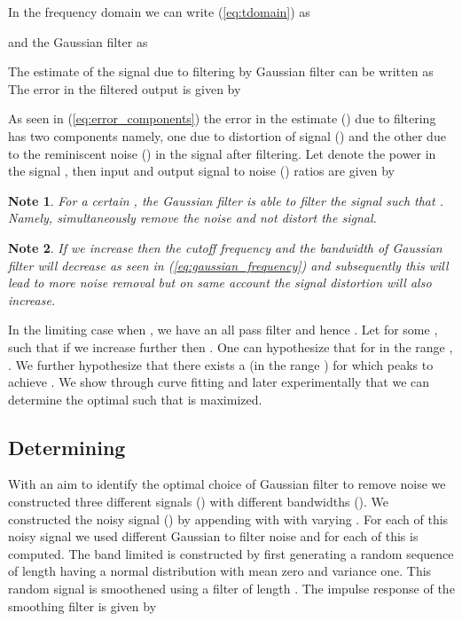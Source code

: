 \documentclass[journal,onecolumn]{IEEEtran}
\newtheorem{mynote}{Note}
\begin{document}
In the frequency domain we can write (\ref{eq:tdomain}) as
 
 and the Gaussian filter as

  The estimate of the signal 
 due to filtering by Gaussian filter can be
written as
  The error in the filtered output is given by
 
 As seen in (\ref{eq:error_components}) the error in the estimate ()
due to 
filtering has two components namely, one due to distortion of signal 
()
and 
the other due to the reminiscent noise  ()
in the signal after filtering. 
Let  denote the power in the signal , then
input and output signal to noise () ratios are given by 
 
\begin{mynote}
For a certain ,  the Gaussian filter is able to filter the signal
such that . Namely,
simultaneously 
remove the
noise and 
not distort the signal. 
\end{mynote}
\begin{mynote}
If we increase  then the cutoff frequency and the 
bandwidth of Gaussian filter will decrease as seen in 
(\ref{eq:gaussian_frequency}) and subsequently this will lead to more 
noise removal but on same account the signal distortion will also increase. 
\end{mynote}
In the limiting case when 
,  we have an all pass filter and hence 
. 
Let for some  
, such that  
if we increase  further then . 
One can hypothesize that for  in the range 
, . 
We further hypothesize that there exists a 
 (in the range ) for which  
peaks to achieve . We show through curve fitting and later 
experimentally that we can determine the optimal  
such that  is maximized.

\subsection{Determining }

With an aim to identify  the optimal choice of 
Gaussian filter to remove noise we constructed three different signals 
() with different bandwidths (). We constructed the noisy 
signal () by appending  with  with 
varying . For each of this noisy signal we used 
different  Gaussian to filter noise and for each of this 
 is computed.
The band limited   is constructed by first generating 
a random sequence of length  having a normal distribution with mean
zero and variance one. This random signal is smoothened using a filter of length . The impulse response of the smoothing filter is given by
\end{document}
